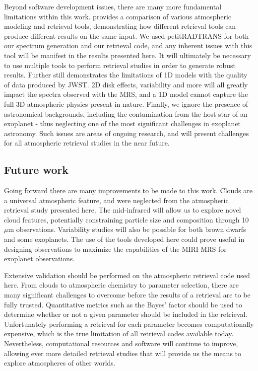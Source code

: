 Beyond software development issues, there are many more fundamental limitations within this work.
\parencite{Barstow2020} provides a comparison of various atmospheric modeling and retrieval tools, demonstrating how different retrieval tools can produce different results on the same input.
We used petitRADTRANS for both our spectrum generation and our retrieval code, and any inherent issues with this tool will be manifest in the results presented here.
It will ultimately be necessary to use multiple tools to perform retrieval studies in order to generate robust results.
Further still \parencite{Taylor2020} demonstrates the limitations of 1D models with the quality of data produced by JWST.
2D disk effects, variability and more will all greatly impact the spectra observed with the MRS, and a 1D model cannot capture the full 3D atmospheric physics present in nature.
Finally, we ignore the presence of astronomical backgrounds, including the contamination from the host star of an exoplanet - thus neglecting one of the most significant challenges in exoplanet astronomy.
Such issues are areas of ongoing research, and will present challenges for all atmospheric retrieval studies in the near future.

\subsection{Future work}
Going forward there are many improvements to be made to this work.
Clouds are a universal atmospheric feature, and were neglected from the atmospheric retrieval study presented here.
The mid-infrared will allow us to explore novel cloud features, potentially constraining particle size and composition through 10 $\mu$m observations.
Variability studies will also be possible for both brown dwarfs and some exoplanets.
The use of the tools developed here could prove useful in designing observations to maximize the capabilities of the MIRI MRS for exoplanet observations.

Extensive validation should be performed on the atmospheric retrieval code used here.
From clouds to atmospheric chemistry to parameter selection, there are many significant challenges to overcome before the results of a retrieval are to be fully trusted.
Quantitative metrics such as the Bayes' factor should be used to determine whether or not a given parameter should be included in the retrieval.
Unfortunately performing a retrieval for each parameter becomes computationally expensive, which is the true limitation of all retrieval codes available today.
Nevertheless, computational resources and software will continue to improve, allowing ever more detailed retrieval studies that will provide us the means to explore atmospheres of other worlds.